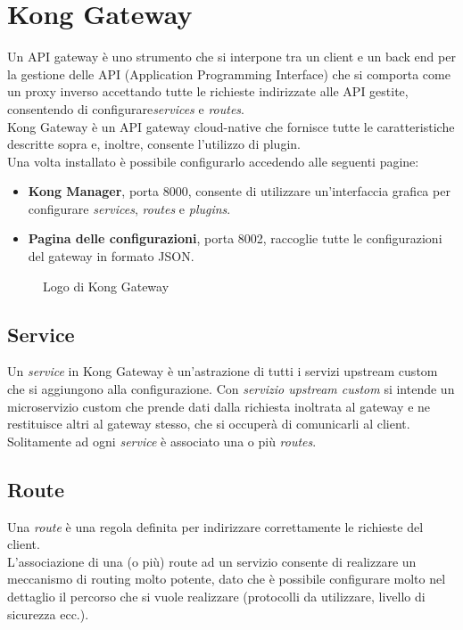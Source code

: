 \section{Kong Gateway}
Un API gateway è uno strumento che si interpone tra un client e un back end per la gestione delle API (Application Programming Interface) che si comporta come un proxy inverso accettando tutte le richieste indirizzate alle API gestite, consentendo di configurare\emph{services} e \emph{routes}.\\
Kong Gateway è un API gateway cloud-native che fornisce tutte le caratteristiche descritte sopra e, inoltre, consente l’utilizzo di plugin.\\
Una volta installato è possibile configurarlo accedendo alle seguenti pagine:
\begin{itemize}
	\item \textbf{Kong Manager}, porta 8000, consente di utilizzare un’interfaccia grafica per configurare \emph{services}, \emph{routes} e \emph{plugins}.
	\item \textbf{Pagina delle configurazioni}, porta 8002, raccoglie tutte le configurazioni del gateway in formato JSON.
\end{itemize}
\begin{figure}[ht]
	\centering
	\caption{Logo di Kong Gateway}
	\label{fig:one}
\end{figure}
\subsection{Service}
Un \emph{service} in Kong Gateway è un’astrazione di tutti i servizi upstream custom che si aggiungono alla configurazione. Con \emph{servizio upstream custom} si intende un microservizio custom che prende dati dalla richiesta inoltrata al gateway e ne restituisce altri al gateway stesso, che si occuperà di comunicarli al client.\\
Solitamente ad ogni \emph{service} è associato una o più \emph{routes}.\\

\subsection{Route}
Una \emph{route} è una regola definita per indirizzare correttamente le richieste del client.\\
L’associazione di una (o più) route ad un servizio consente di realizzare un meccanismo di routing molto potente, dato che è possibile configurare molto nel dettaglio il percorso che si vuole realizzare (protocolli da utilizzare, livello di sicurezza ecc.).\\

